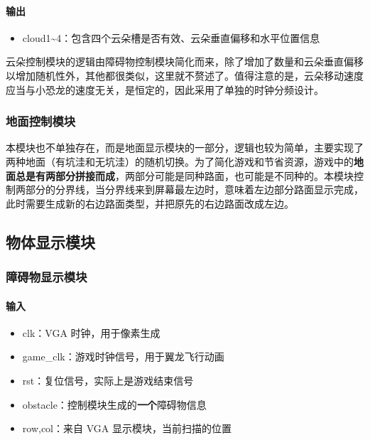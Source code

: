 \documentclass[hyperref,UTF8,12pt,a4paper]{ctexart}
\providecommand{\tightlist}{%
  \setlength{\itemsep}{0pt}\setlength{\parskip}{0pt}}
\begin{document}
\hypertarget{ux8f93ux51fa-3}{%
\paragraph{输出}\label{ux8f93ux51fa-3}}

\begin{itemize}
\tightlist
\item
  cloud1\textasciitilde4：包含四个云朵槽是否有效、云朵垂直偏移和水平位置信息
\end{itemize}

云朵控制模块的逻辑由障碍物控制模块简化而来，除了增加了数量和云朵垂直偏移以增加随机性外，其他都很类似，这里就不赘述了。值得注意的是，云朵移动速度应当与小恐龙的速度无关，是恒定的，因此采用了单独的时钟分频设计。

\hypertarget{ux5730ux9762ux63a7ux5236ux6a21ux5757}{%
\subsubsection{地面控制模块}\label{ux5730ux9762ux63a7ux5236ux6a21ux5757}}

本模块也不单独存在，而是地面显示模块的一部分，逻辑也较为简单，主要实现了两种地面（有坑洼和无坑洼）的随机切换。为了简化游戏和节省资源，游戏中的\textbf{地面总是有两部分拼接而成}，两部分可能是同种路面，也可能是不同种的。本模块控制两部分的分界线，当分界线来到屏幕最左边时，意味着左边部分路面显示完成，此时需要生成新的右边路面类型，并把原先的右边路面改成左边。

\hypertarget{ux7269ux4f53ux663eux793aux6a21ux5757}{%
\subsection{物体显示模块}\label{ux7269ux4f53ux663eux793aux6a21ux5757}}

\hypertarget{ux969cux788dux7269ux663eux793aux6a21ux5757}{%
\subsubsection{障碍物显示模块}\label{ux969cux788dux7269ux663eux793aux6a21ux5757}}

\hypertarget{ux8f93ux5165-4}{%
\paragraph{输入}\label{ux8f93ux5165-4}}

\begin{itemize}
\tightlist
\item
  clk：VGA 时钟，用于像素生成
\item
  game\_clk：游戏时钟信号，用于翼龙飞行动画
\item
  rst：复位信号，实际上是游戏结束信号
\item
  obstacle：控制模块生成的\textbf{一个}障碍物信息
\item
  row,col：来自 VGA 显示模块，当前扫描的位置
\end{itemize}
\end{document}
